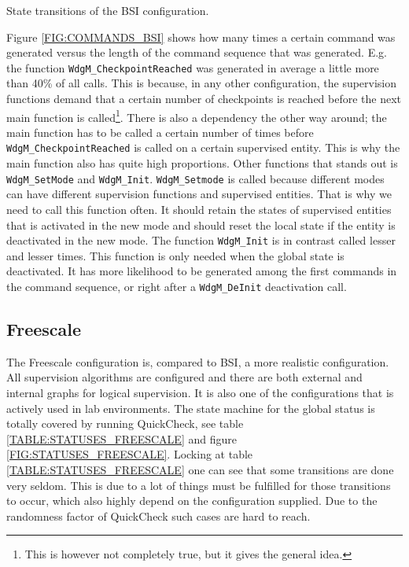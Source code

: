 \begin{table}[!ht]
  \caption{State transitions of the BSI configuration.}
  \label{TABLE:STATUSES_BSI}
  
\end{table}

Figure \ref{FIG:COMMANDS_BSI} shows how many times a certain command
was generated versus the length of the command sequence that was
generated. E.g. the function \lstinline!WdgM_CheckpointReached! was
generated in average a little more than 40\% of all calls. This is
because, in any other configuration, the supervision functions demand
that a certain number of checkpoints is reached before the next main
function is called\footnote{This is however not completely true, but
it gives the general idea.}. There is also a dependency the other way
around; the main function has to be called a certain number of times
before \lstinline!WdgM_CheckpointReached! is called on a certain
supervised entity. This is why the main function also has quite high
proportions. Other functions that stands out is
\lstinline!WdgM_SetMode! and \lstinline!WdgM_Init!.
\lstinline!WdgM_Setmode! is called because different modes can have
different supervision functions and supervised entities. That is why
we need to call this function often. It should retain the states of
supervised entities that is activated in the new mode and should reset
the local state if the entity is deactivated in the new mode. The
function \lstinline!WdgM_Init! is in contrast called lesser and lesser
times. This function is only needed when the global state is
deactivated. It has more likelihood to be generated among the first
commands in the command sequence, or right after a
\lstinline!WdgM_DeInit! deactivation call.


\subsection{Freescale}
The Freescale configuration is, compared to BSI, a more realistic
configuration.  All supervision algorithms are configured and there
are both external and internal graphs for logical supervision. It is
also one of the configurations that is actively used in lab
environments. The state machine for the global status is totally
covered by running QuickCheck, see table
\ref{TABLE:STATUSES_FREESCALE} and figure
\ref{FIG:STATUSES_FREESCALE}. Locking at table \ref{TABLE:STATUSES_FREESCALE}
one can see that some transitions are done very seldom. This is due to a lot of
things must be fulfilled for those transitions to occur, which also highly depend on
the configuration supplied. Due to the randomness factor of QuickCheck such cases are
hard to reach.

